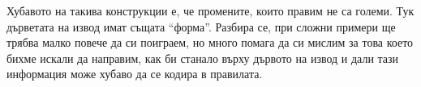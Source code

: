 Хубавото на такива конструкции е, че промените, които правим не са големи.
Тук дърветата на извод имат същата ``форма''.
Разбира се, при сложни примери ще трябва малко повече да си поиграем,
но много помага да си мислим за това което бихме искали да направим,
как би станало върху дървото на извод и дали тази информация може хубаво да се кодира в правилата.
